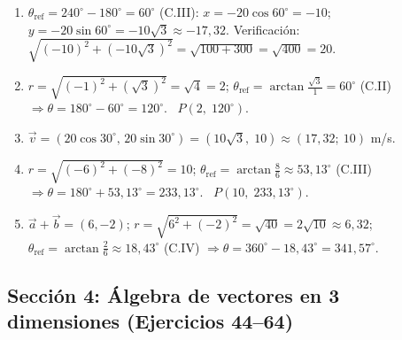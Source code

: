 \documentclass[12pt, letterpaper]{article}
\providecommand{\sen}{\sin}
\begin{document}
\begin{enumerate}[leftmargin=*, label=\textbf{\arabic*.}]
    \item $\theta_{\text{ref}} = 240^{\circ} - 180^{\circ} = 60^{\circ}$ (C.III): $x = -20\cos 60^{\circ} = -10$; $y = -20\sen 60^{\circ} = -10\sqrt{3} \approx -17{,}32$. Verificación: $\sqrt{(-10)^2 + (-10\sqrt{3})^2} = \sqrt{100 + 300} = \sqrt{400} = 20$. \checkmark
    \item $r = \sqrt{(-1)^2 + (\sqrt{3})^2} = \sqrt{4} = 2$; $\theta_{\text{ref}} = \arctan\frac{\sqrt{3}}{1} = 60^{\circ}$ (C.II) $\Rightarrow \theta = 180^{\circ} - 60^{\circ} = 120^{\circ}$. \ $P(2,\; 120^{\circ})$.
    \item $\vec{v} = (20\cos 30^{\circ},\, 20\sen 30^{\circ}) = (10\sqrt{3},\; 10) \approx (17{,}32;\ 10)$ m/s.
    \item $r = \sqrt{(-6)^2 + (-8)^2} = 10$; $\theta_{\text{ref}} = \arctan\frac{8}{6} \approx 53{,}13^{\circ}$ (C.III) $\Rightarrow \theta = 180^{\circ} + 53{,}13^{\circ} = 233{,}13^{\circ}$. \ $P(10,\; 233{,}13^{\circ})$.
    \item $\vec{a} + \vec{b} = (6, -2)$; $r = \sqrt{6^2 + (-2)^2} = \sqrt{40} = 2\sqrt{10} \approx 6{,}32$; $\theta_{\text{ref}} = \arctan\frac{2}{6} \approx 18{,}43^{\circ}$ (C.IV) $\Rightarrow \theta = 360^{\circ} - 18{,}43^{\circ} = 341{,}57^{\circ}$.
  \end{enumerate}

  \subsection*{Sección 4: Álgebra de vectores en 3 dimensiones (Ejercicios 44--64)}
\end{document}
